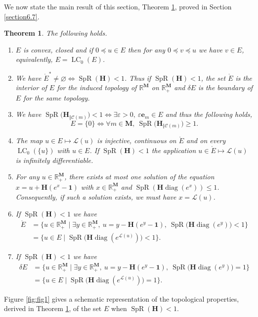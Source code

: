 \documentclass[reqno,final,11pt]{amsart}
\theoremstyle{plain}
\newtheorem{theorem}{Theorem}[section]
\theoremstyle{definition}
\theoremstyle{remark}
\newcommand{\R}{\mathds{R}}
\newcommand{\M}{\bm{M}}
\newcommand{\C}{\mathcal{C}}
\renewcommand{\L}{\bm{\mathscr{L}}}
\newcommand{\ones}{\bm{1}}
\newcommand{\e}{\bm{e}}
\renewcommand{\H}{\bm{H}}
\newcommand{\pos}{\R_+^{\M}}
\newcommand{\CE}{\ce_{0}}
\DeclareMathOperator{\diag}{diag}
\DeclareMathOperator{\spr}{SpR}
\DeclareMathOperator{\ce}{LC}
\begin{document}
We now state the main result of this section, Theorem \ref{thm exact multD}, proved in Section \ref{section6.7}.

\begin{theorem}\label{thm exact multD}
	The following holds.
	\begin{enumerate}
		\item $E$ is convex, closed and if $0 \preceq u \in E$ then for any $0\preceq v \preceq u$ we have $v\in E$, equivalently, $E = \CE(E)$.	
		\item We have $\mathring{E}^* \neq \varnothing \iff \spr(\H)<1$. Thus if $\spr(\H)<1$, the set $\mathring{E}$ is the interior of $E$ for the induced topology of $\R^{\M}$ on $\R^{\M}_+$ and $\delta E$ is the boundary of $E$ for the same topology.
		\item We have $\spr\big( \H_{\Vert \C(m)} \big) <1 \iff \exists \varepsilon >0, \ \varepsilon \e_m \in E$ and thus the following holds, \[E = \{0\} \iff \forall m\in\M, \ \spr\big(\H_{\Vert \C(m)} \big) \geq 1.\]
		\item The map $u\in E \mapsto \L(u)$ is injective, continuous on $\mathring{E}$ and on every $\CE(\{u\})$ with $u\in E$. If $\spr(\H)<1$ the application $u\in \mathring{E} \mapsto \L(u)$ is infinitely differentiable.
		\item For any $u\in\pos$, there exists at most one solution of the equation $x = u+\H(e^x-\ones)$ with $x\in\pos$ and $\spr(\H \diag(e^{x}))\leq 1$. Consequently, if such a solution exists, we must have $x = \L(u)$.
		\item If $\spr(\H)<1$ we have 
	\begin{align*}
			\mathring{E} & = \big\{ u \in\pos \mid \exists y\in\pos, \ u = y-\H(e^y-\ones), \ \spr\big(\H\diag(e^{y})\big) <1 \big\}\\
			& = \big\{ u \in E \mid \spr\big(\H\diag(e^{\L(u)})\big) <1 \big\}.
	\end{align*}
		\item If $\spr(\H)<1$ we have 
	\begin{align*}
	\delta E & = \big\{ u \in\pos \mid \exists y\in\pos, \ u = y-\H(e^y-\ones), \ \spr\big(\H\diag(e^{y})\big) = 1 \big\}\\
	& = \big\{ u \in E \mid \spr\big(\H\diag(e^{\L(u)})\big) = 1 \big\}.
	\end{align*}
	\end{enumerate}
\end{theorem}

Figure \ref{fig:fig1} gives a schematic representation of the topological properties, derived in Theorem \ref{thm exact multD}, of the set $E$ when $\spr(\H)< 1$.
\end{document}
